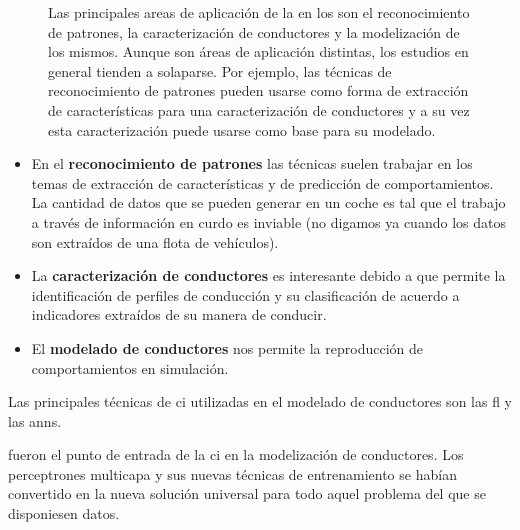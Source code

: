 \begin{figure}
	\centering
	\caption{Las principales areas de aplicación de la  en los  son el reconocimiento de patrones, la caracterización de conductores y la modelización de los mismos. Aunque son áreas de aplicación distintas, los estudios en general tienden a solaparse. Por ejemplo, las técnicas de reconocimiento de patrones pueden usarse como forma de extracción de características para una caracterización de conductores y a su vez esta caracterización puede usarse como base para su modelado.}
	\label{fig:main-applications-of-ci-in-its}
\end{figure}

\begin{itemize}
	\item En el \textbf{reconocimiento de patrones} las técnicas suelen trabajar en los temas de extracción de características y de predicción de comportamientos. La cantidad de datos que se pueden generar en un coche es tal que el trabajo a través de información en curdo es inviable (no digamos ya cuando los datos son extraídos de una flota de vehículos).
	\item La \textbf{caracterización de conductores} es interesante debido a que permite la identificación de perfiles de conducción y su clasificación de acuerdo a indicadores extraídos de su manera de conducir.
	\item El \textbf{modelado de conductores} nos permite la reproducción de comportamientos en simulación.
\end{itemize}

Las principales técnicas de \gls{ci} utilizadas en el modelado de conductores son las \gls{fl} y las \glspl{ann}.

 fueron el punto de entrada de la \gls{ci} en la modelización de conductores. Los perceptrones multicapa y sus nuevas técnicas de entrenamiento se habían convertido en la nueva solución universal para todo aquel problema del que se disponiesen datos.

